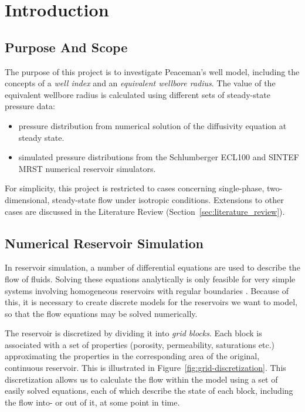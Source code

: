 
\section{Introduction} %
\label{sec:introduction}
\subsection{Purpose And Scope} %
\label{sub:purpose_and_scope}
The purpose of this project is to investigate Peaceman's well model, including the concepts of a \emph{well index} and an \emph{equivalent wellbore radius}. The value of the equivalent wellbore radius is calculated using different sets of steady-state pressure data:
\begin{itemize}
    \item pressure distribution from numerical solution of the diffusivity equation at steady state.
    \item simulated pressure distributions from the Schlumberger ECL100 and SINTEF MRST numerical reservoir simulators.
\end{itemize}

For simplicity, this project is restricted to cases concerning single-phase, two-dimensional, steady-state flow under isotropic conditions. Extensions to other cases are discussed in the Literature Review (Section~\ref{sec:literature_review}).

\subsection{Numerical Reservoir Simulation} %
\label{sub:numerical_reservoir_simulation}
In reservoir simulation, a number of differential equations are used to describe the flow of fluids. Solving these equations analytically is only feasible for very simple systems involving homogeneous reservoirs with regular boundaries \cite{Peaceman1977Fundamentals}. Because of this, it is necessary to create discrete models for the reservoirs we want to model, so that the flow equations may be solved numerically.


The reservoir is discretized by dividing it into \emph{grid blocks}. Each block is associated with a set of properties (porosity, permeability, saturations etc.) approximating the properties in the corresponding area of the original, continuous reservoir. This is illustrated in Figure~\ref{fig:grid-discretization}. This discretization allows us to calculate the flow within the model using a set of easily solved equations, each of which describe the state of each block, including the flow into- or out of it, at some point in time.

